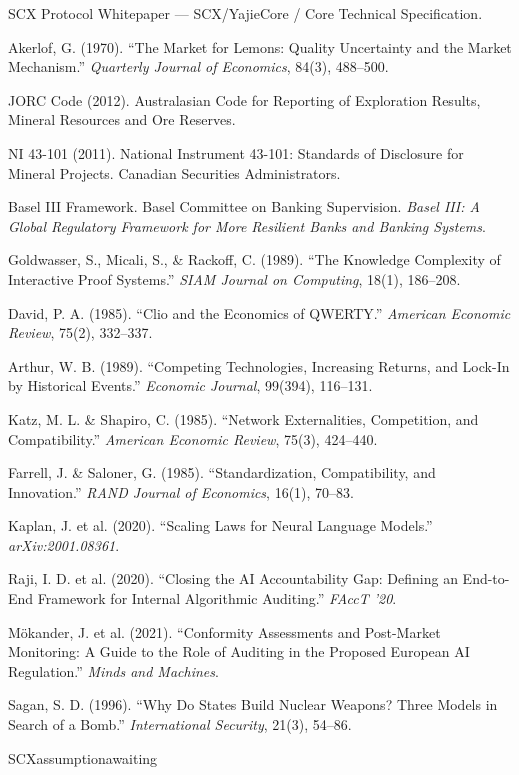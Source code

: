 \documentclass[12pt,a4paper]{article}
\theoremstyle{remark}
\begin{document}
\begin{enumerate}[leftmargin=*, label={[\arabic*]}]
    \item SCX Protocol Whitepaper — SCX/YajieCore / Core Technical Specification.
    \item Akerlof, G. (1970). ``The Market for Lemons: Quality Uncertainty and the Market Mechanism.'' \textit{Quarterly Journal of Economics}, 84(3), 488--500.
    \item JORC Code (2012). Australasian Code for Reporting of Exploration Results, Mineral Resources and Ore Reserves.
    \item NI 43-101 (2011). National Instrument 43-101: Standards of Disclosure for Mineral Projects. Canadian Securities Administrators.
    \item Basel III Framework. Basel Committee on Banking Supervision. \textit{Basel III: A Global Regulatory Framework for More Resilient Banks and Banking Systems}.
    \item Goldwasser, S., Micali, S., \& Rackoff, C. (1989). ``The Knowledge Complexity of Interactive Proof Systems.'' \textit{SIAM Journal on Computing}, 18(1), 186--208.
    \item David, P. A. (1985). ``Clio and the Economics of QWERTY.'' \textit{American Economic Review}, 75(2), 332--337.
    \item Arthur, W. B. (1989). ``Competing Technologies, Increasing Returns, and Lock-In by Historical Events.'' \textit{Economic Journal}, 99(394), 116--131.
    \item Katz, M. L. \& Shapiro, C. (1985). ``Network Externalities, Competition, and Compatibility.'' \textit{American Economic Review}, 75(3), 424--440.
    \item Farrell, J. \& Saloner, G. (1985). ``Standardization, Compatibility, and Innovation.'' \textit{RAND Journal of Economics}, 16(1), 70--83.
    \item Kaplan, J. et al. (2020). ``Scaling Laws for Neural Language Models.'' \textit{arXiv:2001.08361}.
    \item Raji, I. D. et al. (2020). ``Closing the AI Accountability Gap: Defining an End-to-End Framework for Internal Algorithmic Auditing.'' \textit{FAccT '20}.
    \item M\"{o}kander, J. et al. (2021). ``Conformity Assessments and Post-Market Monitoring: A Guide to the Role of Auditing in the Proposed European AI Regulation.'' \textit{Minds and Machines}.
    \item Sagan, S. D. (1996). ``Why Do States Build Nuclear Weapons? Three Models in Search of a Bomb.'' \textit{International Security}, 21(3), 54--86.
    \item SCXassumptionawaiting
\end{enumerate}
\end{document}
